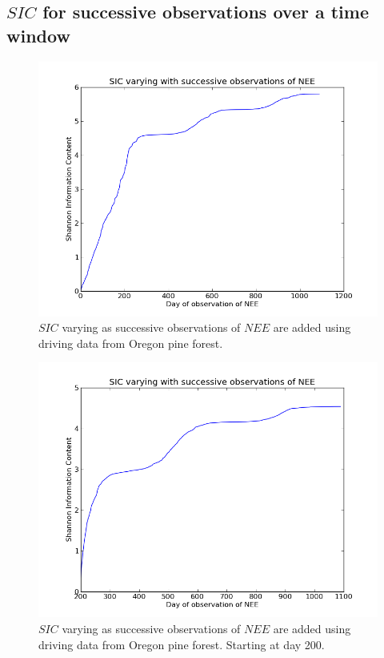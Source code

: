 \documentclass[11pt]{article}
\begin{document}
\subsection*{$SIC$ for successive observations over a time window}

\begin{figure}[ht]
\centering
\includegraphics[width=1\textwidth]{SIC_0_1090.png}
\caption{$SIC$ varying as successive observations of $NEE$ are added using driving data from Oregon pine forest.}
\label{fig:SIC_subplot}
\end{figure} 

\begin{figure}[ht]
\centering
\includegraphics[width=1\textwidth]{SIC_200_1090.png}
\caption{$SIC$ varying as successive observations of $NEE$ are added using driving data from Oregon pine forest. Starting at day 200.}
\label{fig:SIC_subplot}
\end{figure}
\end{document}
